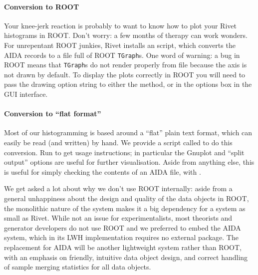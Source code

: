 \documentclass{JHEP3}
\begin{document}
\paragraph{Conversion to ROOT}

Your knee-jerk reaction is probably to want to know how to plot your Rivet
histograms in ROOT\cite{Antcheva:2009zz}. Don't worry: a few months of therapy
can work wonders. For unrepentant ROOT junkies, Rivet installs an
 script, which converts the AIDA records to a  file
full of ROOT \texttt{TGraph}s. One word of warning: a bug in ROOT means that
\texttt{TGraph}s do not render properly from file because the axis is not drawn by
default. To display the plots correctly in ROOT you will need to pass the
 drawing option string to either the  method, or
in the options box in the  GUI interface.

\paragraph{Conversion to ``flat format''}

Most of our histogramming is based around a ``flat'' plain text format,
which can easily be read (and written) by hand. We provide a script called
 to do this conversion. Run  to get usage
instructions; in particular the Gnuplot and ``split output'' options are useful
for further visualisation. Aside from anything else, this is useful for simply
checking the contents of an AIDA file, with .

\vspace{1.8em}

\begin{detail}
  We get asked a lot about why we don't use ROOT internally: aside from a
  general unhappiness about the design and quality of the data objects in ROOT,
  the monolithic nature of the system makes it a big dependency for a system as
  small as Rivet. While not an issue for experimentalists, most theorists and
  generator developers do not use ROOT and we preferred to embed the AIDA
  system, which in its LWH implementation requires no external package. The
  replacement for AIDA will be another lightweight system rather than ROOT, with
  an emphasis on friendly, intuitive data object design, and correct handling of
  sample merging statistics for all data objects.
\end{detail}
\end{document}
